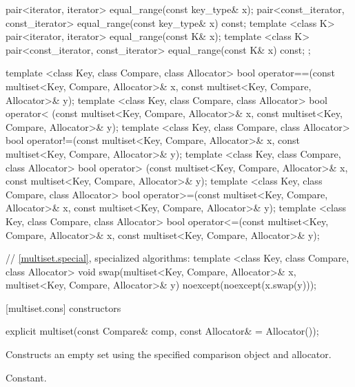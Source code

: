 \begin{codeblock}
{{    pair<iterator, iterator>               equal_range(const key_type& x);
    pair<const_iterator, const_iterator>   equal_range(const key_type& x) const;
    template <class K>
      pair<iterator, iterator>             equal_range(const K& x);
    template <class K>
      pair<const_iterator, const_iterator> equal_range(const K& x) const;
  };

  template <class Key, class Compare, class Allocator>
    bool operator==(const multiset<Key, Compare, Allocator>& x,
                    const multiset<Key, Compare, Allocator>& y);
  template <class Key, class Compare, class Allocator>
    bool operator< (const multiset<Key, Compare, Allocator>& x,
                    const multiset<Key, Compare, Allocator>& y);
  template <class Key, class Compare, class Allocator>
    bool operator!=(const multiset<Key, Compare, Allocator>& x,
                    const multiset<Key, Compare, Allocator>& y);
  template <class Key, class Compare, class Allocator>
    bool operator> (const multiset<Key, Compare, Allocator>& x,
                    const multiset<Key, Compare, Allocator>& y);
  template <class Key, class Compare, class Allocator>
    bool operator>=(const multiset<Key, Compare, Allocator>& x,
                    const multiset<Key, Compare, Allocator>& y);
  template <class Key, class Compare, class Allocator>
    bool operator<=(const multiset<Key, Compare, Allocator>& x,
                    const multiset<Key, Compare, Allocator>& y);

  // \ref{multiset.special}, specialized algorithms:
  template <class Key, class Compare, class Allocator>
    void swap(multiset<Key, Compare, Allocator>& x,
              multiset<Key, Compare, Allocator>& y)
      noexcept(noexcept(x.swap(y)));
}
\end{codeblock}%
%

[multiset.cons]{ constructors}

%
\begin{itemdecl}
explicit multiset(const Compare& comp, const Allocator& = Allocator());
\end{itemdecl}

\begin{itemdescr}
\pnum
\effects
Constructs an empty set using the specified comparison object and allocator.

\pnum
\complexity
Constant.
\end{itemdescr}

